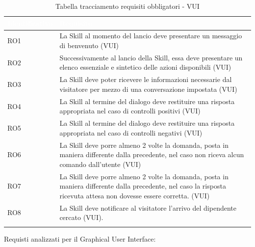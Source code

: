 \begin{center}
	\centering
	\renewcommand{\arraystretch}{1.5}
	\begin{longtable}{  p{2.5cm} p{9.8cm} }
		\rowcolor{tableHead}
		\textbf{\textcolor{white}{Identificativo}} & \textbf{\textcolor{white}{Requisito}} \\
		\endhead  
		RO1 & La Skill al momento del lancio deve presentare un messaggio di benvenuto (VUI) \\
		RO2 & Successivamente al lancio della Skill, essa deve presentare un elenco essenziale e sintetico delle azioni disponibili (VUI) \\ 
		RO3 & La Skill deve poter ricevere le informazioni necessarie dal visitatore per mezzo di una conversazione impostata (VUI) \\
		RO4 & La Skill al termine del dialogo deve restituire una risposta appropriata nel caso di controlli positivi (VUI) \\
		RO5 & La Skill al termine del dialogo deve restituire una risposta appropriata nel caso di controlli negativi (VUI) \\
		RO6 & La Skill deve porre almeno 2 volte la domanda, posta in maniera differente dalla precedente, nel caso non riceva alcun comando dall'utente (VUI) \\
		RO7 & La Skill deve porre almeno 2 volte la domanda, posta in maniera differente dalla precedente, nel caso la risposta ricevuta attesa non dovesse essere corretta. (VUI)  \\
		RO8 & La Skill deve notificare al visitatore l'arrivo del dipendente cercato (VUI).\\
		\rowcolor{white}
		\caption{Tabella tracciamento requisiti obbligatori - VUI}
	\end{longtable}
\end{center}
Requisti analizzati per il Graphical User Interface:
